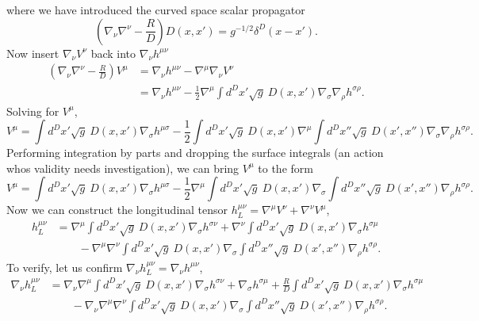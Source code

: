 \documentclass[10pt,letterpaper]{article}
\numberwithin{equation}{subsection}
\begin{document}
where we have introduced the curved space scalar propagator
\begin{equation}
\left( \nabla_\nu \nabla^\nu -\frac{R}{D} \right)D(x,x') = g^{-1/2} \delta^D(x-x').
\end{equation}
Now insert $\nabla_\nu V^\nu$ back into $\nabla_\nu h^{\mu\nu}$
\begin{align}
\left(\nabla_\nu\nabla^\nu - \frac{R}{D}\right)V^\mu&= \nabla_\nu h^{\mu\nu} -\nabla^\mu \nabla_\nu V^\nu 
\nonumber\\
&=  \nabla_\nu h^{\mu\nu} - \frac12 \nabla^\mu  \int d^Dx' \sqrt{g}\ D(x,x') \nabla_\sigma\nabla_\rho h^{\sigma\rho}.
\end{align}
Solving for $V^\mu$,
\begin{equation}
V^{\mu} =   \int d^Dx' \sqrt{g}\ D(x,x') \nabla_\sigma h^{\mu\sigma} - \frac12
  \int d^Dx' \sqrt{g}\ D(x,x')\nabla^\mu   \int d^Dx'' \sqrt{g}\ D(x',x'') \nabla_\sigma\nabla_\rho h^{\sigma\rho}.
\end{equation}
Performing integration by parts and dropping the surface integrals (an action whos validity needs investigation), we can bring $V^\mu$ to the form
\begin{equation}
V^{\mu} =   \int d^Dx' \sqrt{g}\ D(x,x') \nabla_\sigma h^{\mu\sigma} - \frac12\nabla^\mu 
  \int d^Dx' \sqrt{g}\ D(x,x')\nabla_\sigma   \int d^Dx'' \sqrt{g}\ D(x',x'') \nabla_\rho h^{\sigma\rho}.
\end{equation}
Now we can construct the longitudinal tensor $h^{\mu\nu}_L = \nabla^\mu V^\nu + \nabla^\nu V^\mu$, 
\begin{align}
  h^{\mu\nu}_L&=\nabla^\mu \int d^Dx' \sqrt{g}\ D(x,x')\nabla_\sigma h^{\sigma\nu} + \nabla^\nu \int d^Dx' \sqrt{g}\  D(x,x')\nabla_\sigma h^{\sigma\mu} 
\\
&\qquad -  
 \nabla^\mu\nabla^\nu \int d^Dx'\sqrt{g}\  D(x,x') \nabla_\sigma \int d^Dx'' \sqrt{g}\ D(x',x'')\nabla_\rho h^{\sigma\rho}.
\end{align}
To verify, let us confirm $\nabla_\nu h^{\mu\nu}_L = \nabla_\nu h^{\mu\nu}$,
\begin{align}
\nabla_\nu h^{\mu\nu}_L &= \nabla_\nu \nabla^\mu \int d^Dx' \sqrt{g}\ D(x,x')\nabla_\sigma h^{\sigma\nu}
+ \nabla_\sigma h^{\sigma\mu} + \frac{R}{D}  \int d^Dx' \sqrt{g}\  D(x,x')\nabla_\sigma h^{\sigma\mu} 
\\
&\qquad - \nabla_\nu \nabla^\mu \nabla^\nu \int d^Dx'\sqrt{g}\  D(x,x') \nabla_\sigma \int d^Dx'' \sqrt{g}\ D(x',x'')\nabla_\rho h^{\sigma\rho}.
\end{align}
\end{document}
